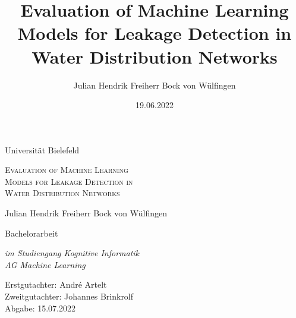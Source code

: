 \documentclass{report} %
\title{
    Evaluation of Machine Learning Models for Leakage Detection in Water Distribution Networks
}
\author{Julian Hendrik Freiherr Bock von Wülfingen}
\date{19.06.2022}
\begin{document}
\onehalfspacing


\begin{titlepage}

	\begin{center}

        \vspace*{\baselineskip}

        {\Large Universität Bielefeld}
        
        \vspace{1.75\baselineskip}

        {\LARGE \scshape Evaluation of Machine Learning \\ Models for Leakage Detection in \\ Water Distribution Networks\par} %

        \vspace{5\baselineskip}
        
        {\Large Julian Hendrik Freiherr Bock von Wülfingen}
        
        \vspace{2\baselineskip}

        {\Large Bachelorarbeit\vspace{1em}}
        
        \textit{im Studiengang Kognitive Informatik \vspace{1em} \\ AG Machine Learning}
	
        \vfill

        \vspace{0.3\baselineskip}
        
        Erstgutachter:	  André Artelt\\
        Zweitgutachter:	  Johannes Brinkrolf\\
        Abgabe:		    15.07.2022

    \end{center}

\end{titlepage}

\tableofcontents

\cleardoublepage
{}
















\appendix


\end{document}
